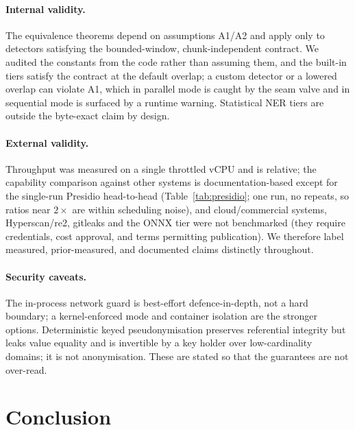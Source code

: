 \documentclass[runningheads]{llncs}
\begin{document}
\paragraph{Internal validity.}
The equivalence theorems depend on assumptions A1/A2 and apply only to detectors
satisfying the bounded-window, chunk-independent contract. We audited the
constants from the code rather than assuming them, and the built-in tiers satisfy
the contract at the default overlap; a custom detector or a lowered overlap can
violate A1, which in parallel mode is caught by the seam valve and in sequential
mode is surfaced by a runtime warning. Statistical NER tiers are outside the
byte-exact claim by design.

\paragraph{External validity.}
Throughput was measured on a single throttled vCPU and is relative; the
capability comparison against other systems is documentation-based except for the
single-run Presidio head-to-head (Table~\ref{tab:presidio}; one run, no repeats, so
ratios near $2\times$ are within scheduling noise), and cloud/commercial systems,
Hyperscan/re2, gitleaks and the ONNX tier were not benchmarked (they
require credentials, cost approval, and terms permitting publication). We
therefore label measured, prior-measured, and documented claims distinctly
throughout.

\paragraph{Security caveats.}
The in-process network guard is best-effort defence-in-depth, not a hard
boundary; a kernel-enforced mode and container isolation are the stronger
options. Deterministic keyed pseudonymisation preserves referential integrity but
leaks value equality and is invertible by a key holder over low-cardinality
domains; it is not anonymisation. These are stated so that the guarantees are not
over-read.

\section{Conclusion}
\label{sec:conclusion}
\end{document}
